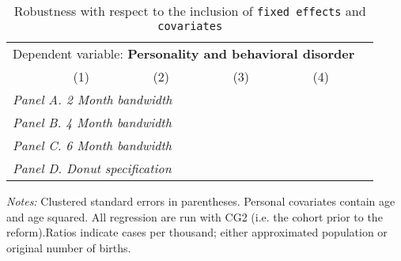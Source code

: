  \begin{table}[H] \begin{threeparttable} \centering \caption{Robustness with respect to the inclusion of \texttt{fixed effects} and \texttt{covariates}} {\def\sym#1{\ifmmode^{#1}\else\(^{#1}\)\fi} \begin{tabular}{l*{5}{c}} \toprule \multicolumn{5}{c}{Dependent variable: \textbf{Personality and behavioral disorder}} \\ \cmidrule(lr){2-5}
            &\multicolumn{1}{c}{(1)}&\multicolumn{1}{c}{(2)}&\multicolumn{1}{c}{(3)}&\multicolumn{1}{c}{(4)}\\
\midrule
 \multicolumn{5}{l}{\emph{Panel A. 2 Month bandwidth}} \\    \midrule\multicolumn{5}{l}{\emph{Panel B. 4 Month bandwidth}} \\    \midrule\multicolumn{5}{l}{\emph{Panel C. 6 Month bandwidth}} \\    \midrule\multicolumn{5}{l}{\emph{Panel D. Donut specification}} \\    \midrule  
\bottomrule \end{tabular} } \begin{tablenotes} \item \scriptsize \emph{Notes:} Clustered standard errors in parentheses. Personal covariates contain age and age squared. All regression are run with CG2 (i.e. the cohort prior to the reform).Ratios indicate cases per thousand; either approximated population or original number of births. \end{tablenotes} \end{threeparttable} \end{table} 
